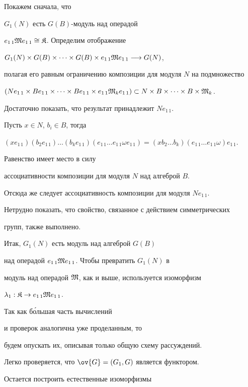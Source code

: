 \begin{pf}
Покажем сначала, что


$G_1(N)$ есть $G(B)$-модуль над операдой


$e_{1\,1}\frak M e_{1\,1}\cong \frak K$. Определим отображение


$G_1(N)\times G(B)\times\dotsb \times


G(B)\times e_{1\,1}\frak M e_{1\,1}\longrightarrow G(N)$,


полагая его равным ограничению композиции для модуля $N$ на подмножество


$(Ne_{1\,1}\times Be_{1\,1}\times\dotsb \times


Be_{1\,1}\times e_{1\,1}\frak M_k e_{1\,1})\subset


N\times B\times\dotsb \times B\times\frak M_k$.


Достаточно показать, что результат принадлежит $Ne_{1\,1}$.


Пусть $x\in N$, $b_i\in B$, тогда


$(xe_{1\,1})(b_2 e_{1\,1})\dotsc (b_k e_{1\,1})


(e_{1\,1}\dotsc e_{1\,1}\omega e_{1\,1})=


(xb_2\dotsc b_k)(e_{1\,1}\dots e_{1\,1}\omega) e_{1\,1}$.


Равенство имеет место в силу


ассоциативности композиции для модуля $N$ над алгеброй $B$.


Отсюда же следует ассоциативность композиции для модуля $Ne_{1\,1}$.


Нетрудно показать, что свойство, связанное с действием симметрических


групп, также выполнено.


Итак, $G_1(N)$ есть модуль над алгеброй $G(B)$


над операдой $e_{1\,1}\frak M e_{1\,1}$. Чтобы превратить $G_1(N)$ в


модуль над операдой $\frak M$, как и выше, используется изоморфизм


$\lambda_1:\frak K\to e_{1\,1}\frak M e_{1\,1}$.


Так как б\'ольшая часть вычислений


и проверок аналогична уже проделанным, то


будем опускать их, описывая только общую схему рассуждений.





Легко проверяется, что $\ov{G}=(G_1,G)$ является функтором.


Остается построить естественные изоморфизмы



\end{pf}
